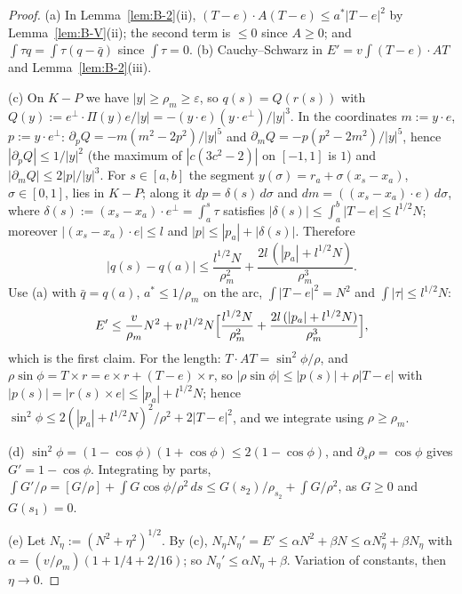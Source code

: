 \begin{proof}
(a) In Lemma~\ref{lem:B-2}(ii), $(T-e)\cdot A(T-e)\le a^*|T-e|^2$ by Lemma~\ref{lem:B-V}(ii); the second term is $\le0$ since
$A\ge0$; and $\int\tau q=\int\tau(q-\bar q)$ since $\int\tau=0$. (b) Cauchy--Schwarz in $E'=v\int(T-e)\cdot AT$ and
Lemma~\ref{lem:B-2}(iii).

(c) On $K-P$ we have $|y|\ge\rho_m\ge\varepsilon$, so $q(s)=Q(r(s))$ with
$Q(y):=e^\perp\cdot\Pi(y)e/|y|=-(y\cdot e)(y\cdot e^\perp)/|y|^3$. In the coordinates $m:=y\cdot e$, $p:=y\cdot e^\perp$:
$\partial_pQ=-m(m^2-2p^2)/|y|^5$ and $\partial_mQ=-p(p^2-2m^2)/|y|^5$, hence $|\partial_pQ|\le1/|y|^2$ (the maximum of
$|c(3c^2-2)|$ on $[-1,1]$ is $1$) and $|\partial_mQ|\le2|p|/|y|^3$. For $s\in[a,b]$ the segment
$y(\sigma)=r_a+\sigma(x_s-x_a)$, $\sigma\in[0,1]$, lies in $K-P$; along it $dp=\delta(s)\,d\sigma$ and
$dm=((x_s-x_a)\cdot e)\,d\sigma$, where $\delta(s):=(x_s-x_a)\cdot e^\perp=\int_a^s\tau$ satisfies
$|\delta(s)|\le\int_a^b|T-e|\le l^{1/2}N$; moreover $|(x_s-x_a)\cdot e|\le l$ and $|p|\le|p_a|+|\delta(s)|$. Therefore
\[
|q(s)-q(a)|\le\frac{l^{1/2}N}{\rho_m^2}+\frac{2l\,(|p_a|+l^{1/2}N)}{\rho_m^3}.
\]
Use (a) with $\bar q=q(a)$, $a^*\le1/\rho_m$ on the arc, $\int|T-e|^2=N^2$ and $\int|\tau|\le l^{1/2}N$:
\[
E'\le\frac v{\rho_m}N^2+v\,l^{1/2}N\Bigl[\frac{l^{1/2}N}{\rho_m^2}+\frac{2l\,(|p_a|+l^{1/2}N)}{\rho_m^3}\Bigr],
\]
which is the first claim. For the length: $T\cdot AT=\sin^2\!\phi/\rho$, and $\rho\sin\phi=T\times r=e\times r+(T-e)\times r$, so
$|\rho\sin\phi|\le|p(s)|+\rho|T-e|$ with $|p(s)|=|r(s)\times e|\le|p_a|+l^{1/2}N$; hence
$\sin^2\!\phi\le2(|p_a|+l^{1/2}N)^2/\rho^2+2|T-e|^2$, and we integrate using $\rho\ge\rho_m$.

(d) $\sin^2\!\phi=(1-\cos\phi)(1+\cos\phi)\le2(1-\cos\phi)$, and $\partial_s\rho=\cos\phi$ gives $G'=1-\cos\phi$. Integrating by
parts, $\int G'/\rho=[G/\rho]+\int G\cos\phi/\rho^2\,ds\le G(s_2)/\rho_{s_2}+\int G/\rho^2$, as $G\ge0$ and $G(s_1)=0$.

(e) Let $N_\eta:=(N^2+\eta^2)^{1/2}$. By (c), $N_\eta N_\eta'=E'\le\alpha N^2+\beta N\le\alpha N_\eta^2+\beta N_\eta$ with
$\alpha=(v/\rho_m)(1+1/4+2/16)$; so $N_\eta'\le\alpha N_\eta+\beta$. Variation of constants, then $\eta\to0$.
\end{proof}

